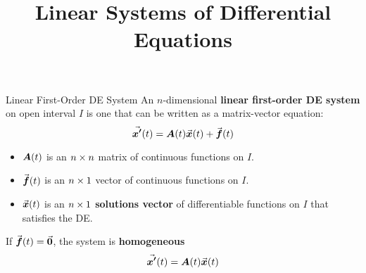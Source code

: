 \documentclass{beamer}
\title[MATH 2250 - Section 6.1]{Linear Systems of Differential Equations}
\begin{document}
\begin{frame}
  \titlepage
\end{frame}

\begin{frame}
\begin{block}{Linear First-Order DE System}
An $n$-dimensional \textbf{linear first-order DE system} on open interval $I$ is one that can be written as a matrix-vector equation:
\begin{equation*}
{\vec{\boldsymbol{x^\prime}}}(t)=\boldsymbol{A}(t){\vec{\boldsymbol{x}}}(t)+{\vec{\boldsymbol{f}}}(t)
\end{equation*}
\onslide<+->
\begin{itemize}[<+- | alert@+>]
\item $\boldsymbol{A}(t)$ is an $n\times n$ matrix of continuous functions on $I$.
\item ${\vec{\boldsymbol{f}}}(t)$ is an $n\times 1$ vector of continuous functions on $I$.
\item ${\vec{\boldsymbol{x}}}(t)$ is an $n\times 1$ \textbf{solutions vector} of differentiable functions on $I$ that satisfies the DE\@.
\end{itemize}
\onslide<+->
If ${\vec{\boldsymbol{f}}}(t)={\vec{\boldsymbol{0}}}$, the system is \textbf{homogeneous}
\begin{equation*}
{\vec{\boldsymbol{x^\prime}}} (t)=\boldsymbol{A}(t){\vec{\boldsymbol{x}}}(t)
\end{equation*}
\end{block}
\end{frame}
\end{document}
